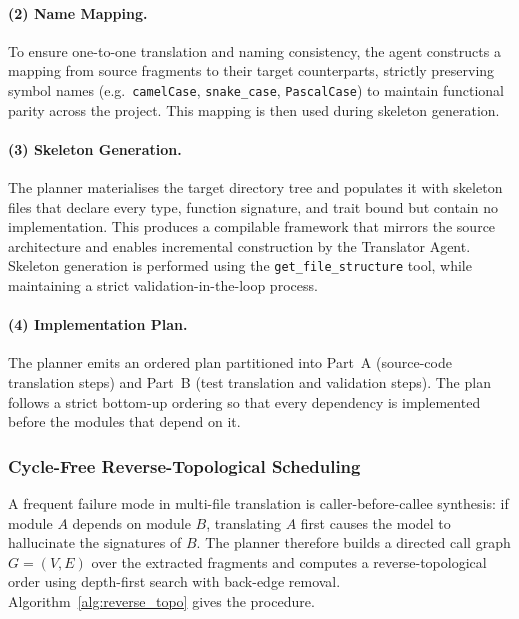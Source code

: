 \paragraph{(2) Name Mapping.}
To ensure one-to-one translation and naming consistency, the agent
constructs a mapping from source fragments to their target
counterparts, strictly preserving symbol names (e.g.\ \texttt{camelCase},
\texttt{snake\_case}, \texttt{PascalCase}) to maintain functional parity
across the project. This mapping is then used during skeleton
generation.

\paragraph{(3) Skeleton Generation.}
The planner materialises the target directory tree and populates it
with skeleton files that declare every type, function signature, and
trait bound but contain no implementation. This produces a compilable
framework that mirrors the source architecture and enables incremental
construction by the Translator Agent. Skeleton generation is
performed using the \texttt{get\_file\_structure} tool, while
maintaining a strict validation-in-the-loop process.

\paragraph{(4) Implementation Plan.}
The planner emits an ordered plan partitioned into Part~A (source-code
translation steps) and Part~B (test translation and validation steps).
The plan follows a strict bottom-up ordering so that every dependency
is implemented before the modules that depend on it.

\subsubsection{Cycle-Free Reverse-Topological Scheduling}

A frequent failure mode in multi-file translation is
caller-before-callee synthesis: if module $A$ depends on module $B$,
translating $A$ first causes the model to hallucinate the signatures
of $B$. The planner therefore builds a directed call graph
$G = (V, E)$ over the extracted fragments and computes a
reverse-topological order using depth-first search with back-edge
removal. Algorithm~\ref{alg:reverse_topo} gives the procedure.

